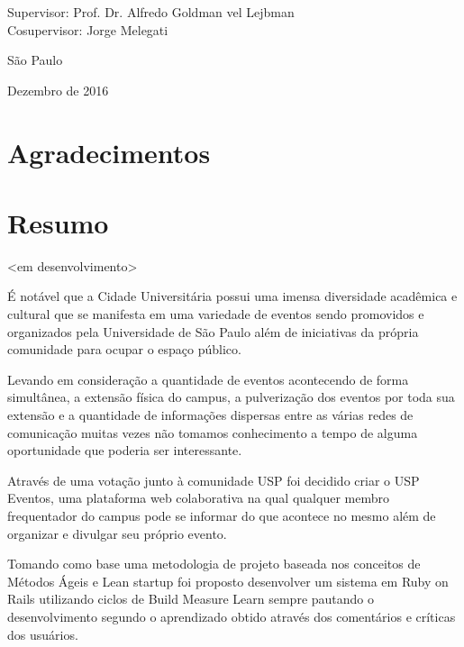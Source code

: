 \documentclass[12pt,twoside,a4paper]{book}
\begin{document}
    \vskip 5cm

    \begin{center}
    Supervisor: Prof. Dr. Alfredo Goldman vel Lejbman\\
    Cosupervisor: Jorge Melegati

    \vskip 5cm
    \normalsize{São Paulo}

    \normalsize{Dezembro de 2016}
    \end{center}
\pagebreak




\chapter*{Agradecimentos}



\chapter*{Resumo}

<em desenvolvimento>\\
    \par É notável que a Cidade Universitária possui uma imensa diversidade acadêmica e cultural que se manifesta em  uma variedade de eventos sendo promovidos e organizados pela Universidade de São Paulo além de iniciativas da própria comunidade para ocupar o espaço público.
    \par Levando em consideração a quantidade de eventos acontecendo de forma simultânea, a extensão física do campus, a pulverização dos eventos por toda sua extensão  e a quantidade de informações dispersas entre as várias redes de comunicação muitas vezes não tomamos conhecimento a tempo de alguma oportunidade que poderia ser interessante.
    \par Através de uma votação junto à comunidade USP foi decidido criar o USP Eventos, uma plataforma web colaborativa na qual qualquer membro frequentador do campus pode se informar do que acontece no mesmo além de organizar e divulgar seu próprio evento.
    \par Tomando como base uma metodologia de projeto baseada nos conceitos de Métodos Ágeis e Lean startup foi proposto desenvolver um sistema em Ruby on Rails utilizando ciclos de Build Measure Learn sempre pautando o desenvolvimento segundo o aprendizado obtido através dos  comentários e críticas dos usuários.
\\
\end{document}
